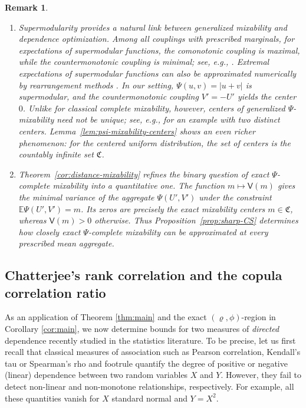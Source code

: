\documentclass{article}
\newtheorem{remark}[theorem]{Remark}
\newcommand{\E}{\mathbb{E}}
\begin{document}
\begin{remark}
\begin{enumerate}[label = (\alph*)]
    \item Supermodularity provides a natural link between generalized mixability and dependence optimization.
    Among all couplings with prescribed marginals, for expectations of supermodular functions, the comonotonic coupling is maximal, while  the countermonotonic coupling is minimal; see, e.g., \cite[Theorems~3.9.8 and~3.9.15]{muller2002comparison}.
    Extremal expectations of supermodular functions can also be approximated numerically by rearrangement methods \cite{puccetti2015computation}.
    In our setting, \(\Psi(u,v)=|u+v|\) is supermodular, and the countermonotonic coupling \(V'=-U'\) yields the center \(0\).
    Unlike for classical complete mixability, however, centers of generalized \(\Psi\)-mixability need not be unique; see, e.g., \cite[Example~11]{bignozzi2015studying} for an example with two distinct centers.
    Lemma~\ref{lem:psi-mixability-centers} shows an even richer phenomenon: for the centered uniform distribution, the set of centers is the countably infinite set \(\mathfrak C\).

    \item Theorem~\ref{cor:distance-mixability} refines the binary question of exact \(\Psi\)-complete mixability into a quantitative one.
    The function \(m\mapsto\mathsf V(m)\) gives the minimal variance of the aggregate \(\Psi(U',V')\) under the constraint \(\E\Psi(U',V')=m\).
    Its zeros are precisely the exact mixability centers \(m\in\mathfrak C\), whereas \(\mathsf V(m)>0\) otherwise.
    Thus Proposition~\ref{prop:sharp-CS} determines how closely exact \(\Psi\)-complete mixability can be approximated at every prescribed mean aggregate.
\end{enumerate}
\end{remark}



\subsection{Chatterjee's rank correlation and the copula correlation ratio}

As an application of Theorem \ref{thm:main} and the exact \((\varrho,\phi)\)-region in Corollary \ref{cor:main}, we now determine bounds for two measures of \emph{directed} dependence recently studied in the statistics literature.
To be precise, let us first recall that classical measures of association such as Pearson correlation, Kendall's tau or Spearman's rho and footrule quantify the degree of positive or negative (linear) dependence between two random variables \(X\) and \(Y\).
However, they fail to detect non-linear and non-monotone relationships, respectively.
For example, all these quantities vanish for \(X\) standard normal and \(Y = X^2\).
\end{document}
